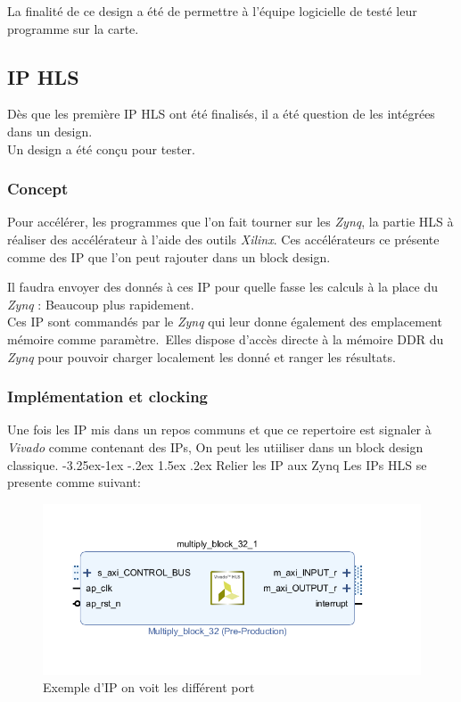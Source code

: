 \documentclass[12pt,a4paper]{article}
\makeatletter
\newcounter {subsubsubsection}[subsubsection]
\newcommand\subsubsubsection{\@startsection{subsubsubsection}{4}{\z@}%
                                     {-3.25ex\@plus -1ex \@minus -.2ex}%
                                     {1.5ex \@plus .2ex}%
                                     {\normalfont\normalsize\bfseries}}
\makeatother
\begin{document}
La finalité de ce design a été de permettre à l'équipe logicielle de testé leur programme sur la carte.
\subsection{IP HLS}
Dès que les première IP HLS ont été finalisés, il a été question de les intégrées dans un design.\\
Un design a été conçu pour tester.
\subsubsection{Concept}
Pour accélérer, les programmes que l'on fait tourner sur les \textit{Zynq}, la partie HLS à réaliser des accélérateur à l'aide des outils \textit{Xilinx}. Ces accélérateurs ce présente comme des IP que l'on peut rajouter dans un block design.

Il faudra envoyer des donnés à ces IP pour quelle fasse les calculs à la place du \textit{Zynq} : Beaucoup plus rapidement.\\

Ces IP sont commandés par le \textit{Zynq} qui leur donne également des emplacement mémoire comme paramètre.\
Elles dispose d'accès directe à la mémoire DDR du \textit{Zynq} pour pouvoir charger localement les donné et ranger les résultats.\\

\subsubsection{Implémentation et clocking}
Une fois les IP mis dans un repos communs et que ce repertoire est signaler à \textit{ Vivado} comme contenant des IPs, On peut les utiiliser dans un block design classique.
\subsubsubsection{Relier les IP aux Zynq}
Les IPs HLS se presente comme suivant:
\begin{figure}[H]
	\centering
		\includegraphics[width=\linewidth]{im/ip1.png}	
	\caption{Exemple d'IP on voit les différent port}
	\label{fig-ip1}
\end{figure}
\end{document}

